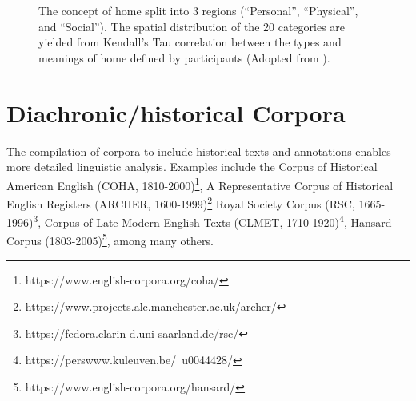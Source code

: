 \begin{figure}[H]
  \begin{minipage}{\textwidth}
    \centering
    \hspace*{.2in}
    \caption{The concept of home split into 3 regions (``Personal'', ``Physical'', and ``Social''). The spatial distribution of the 20 categories are yielded from Kendall's Tau correlation between the types and meanings of home defined by participants  (Adopted from \textcite{sixsmith1986meaning}).}
    \label{fig:home_regions}
  \end{minipage}
\end{figure}

\section{Diachronic/historical Corpora}
The compilation of corpora to include historical texts and annotations enables more detailed linguistic analysis. Examples include
the Corpus of Historical American English (COHA, 1810-2000)\footnote{https://www.english-corpora.org/coha/}, 
A Representative Corpus of Historical English Registers (ARCHER, 1600-1999)\footnote{https://www.projects.alc.manchester.ac.uk/archer/}
Royal Society Corpus (RSC, 1665-1996)\footnote{https://fedora.clarin-d.uni-saarland.de/rsc/}, 
Corpus of Late Modern English Texts (CLMET, 1710-1920)\footnote{https://perswww.kuleuven.be/~u0044428/}, 
Hansard Corpus (1803-2005)\footnote{https://www.english-corpora.org/hansard/}, among many others.

